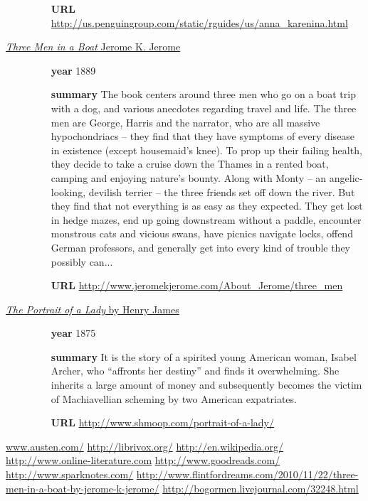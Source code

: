 \documentclass[a4paper,11pt,oneside]{book}
\begin{document}
\begin{description}
\begin{itemize}
	\item [{\bf URL}] \url{http://us.penguingroup.com/static/rguides/us/anna_karenina.html}
	\end{itemize}
\item [\underline{{\it Three Men in a Boat} Jerome K. Jerome}] 
	\begin{itemize}
	\item [{\bf year}] 1889
	\item [{\bf summary}] The book centers around three men who go on a boat trip with a dog, and various anecdotes regarding travel and life. The three men are George, Harris and the narrator, who are all massive hypochondriacs -- they find that they have symptoms of every disease in existence (except housemaid's knee). To prop up their failing health, they decide to take a cruise down the Thames in a rented boat, camping and enjoying nature's bounty. Along with Monty -- an angelic-looking, devilish terrier -- the three friends set off down the river. But they find that not everything is as easy as they expected. They get lost in hedge mazes, end up going downstream without a paddle, encounter monstrous cats and vicious swans, have picnics navigate locks, offend German professors, and generally get into every kind of trouble they possibly can...

	\item [{\bf URL}] \url{http://www.jeromekjerome.com/About_Jerome/three_men}
	\end{itemize}
\item [\underline{{\it The Portrait of a Lady} by Henry James}] 
	\begin{itemize}
	\item [{\bf year}] 1875
	\item [{\bf summary}] It is the story of a spirited young American woman, Isabel Archer, who “affronts her destiny” and finds it overwhelming. She inherits a large amount of money and subsequently becomes the victim of Machiavellian scheming by two American expatriates. 
	\item [{\bf URL}] \url{http://www.shmoop.com/portrait-of-a-lady/}
	\end{itemize}
\end{description}


\pagebreak
\begin{thebibliography}{XXX}
	 \url{www.austen.com/}
	 \url{http://librivox.org/}
	 \url{http://en.wikipedia.org/}
	 \url{http://www.online-literature.com}
	 \url{http://www.goodreads.com/}
	 \url{http://www.sparknotes.com/}
	 \url{http://www.flintfordreams.com/2010/11/22/three-men-in-a-boat-by-jerome-k-jerome/}
	 \url{http://bogormen.livejournal.com/32248.html}
\end{thebibliography}
\end{document}
